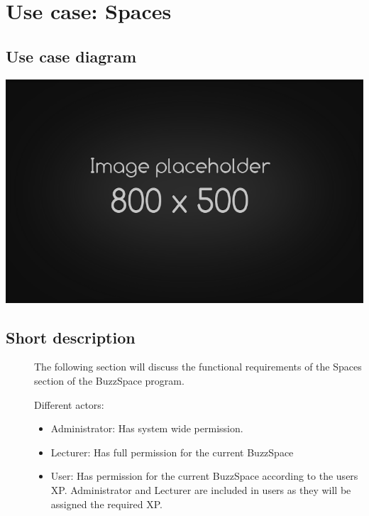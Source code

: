 \documentclass{article}
\begin{document}
	\section{Use case: Spaces}
	\subsection{Use case diagram}
	\includegraphics[width=\textwidth]{spacesUseCase}
	\subsection{Short description}
	\begin{description}
		
		\item[] 
			The following section will discuss the functional requirements of the Spaces section of the BuzzSpace program.
		
		\item[] Different actors:
		\begin{itemize}
			\item Administrator: Has system wide permission.
			\item Lecturer: Has full permission for the current BuzzSpace
			\item User: Has permission for the current BuzzSpace according to the users XP. Administrator and Lecturer are included in users as they will be assigned the required XP.   
		\end{itemize}
		
	\end{description}
	
\end{document}
